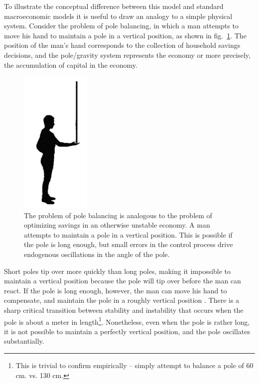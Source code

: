 To illustrate the conceptual difference between this model and standard macroeconomic models it is useful to draw an analogy to a simple physical system. Consider the problem of pole balancing, in which a man attempts to move his hand to maintain a pole in a vertical position, as shown in fig.~\ref{pole_balancing}. The position of the man's hand corresponds to the collection of household savings decisions, and the pole/gravity system represents the economy or more precisely, the accumulation of capital in the economy. 
\begin{figure}
  \begin{minipage}[c]{0.5\textwidth}

	\caption[]{{ The problem of pole balancing is analogous to the problem of optimizing savings in an otherwise unstable economy.}  A man attempts to maintain a pole in a vertical position.  This is possible if the pole is long enough, but small errors in the control process drive endogenous oscillations in the angle of the pole.}
   \label{pole_balancing}
  \end{minipage}
  \begin{minipage}[c]{0.5\textwidth}
    \hspace{2 cm}\includegraphics[width=0.3\textwidth]
       {figures/fig5.jpeg}
  \end{minipage}\hfill

\end{figure}
Short poles tip over more quickly than long poles, making it impossible to maintain a vertical position because the pole will tip over before the man can react.  If the pole is long enough, however, the man can move his hand to compensate, and maintain the pole in a roughly vertical position \citep{insperger2017stick}.  There is a sharp critical transition between stability and instability that occurs when the pole is about a meter in length\footnote{This is trivial to confirm empirically -- simply attempt to balance a pole of 60 cm. vs. 130 cm.}.
Nonetheless, even when the pole is rather long, it is not possible to maintain a perfectly vertical position, and the 
pole oscillates substantially.


